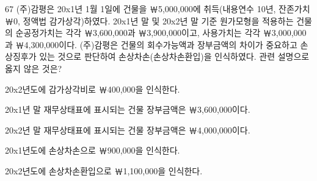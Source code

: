 \begin{question}{67}
(주)감평은 20x1년 1월 1일에 건물을 ￦5,000,000에 취득(내용연수 10년, 잔존가치 ￦0, 정액법 감가상각)하였다. 20x1년 말 및 20x2년 말 기준 원가모형을 적용하는 건물의 순공정가치는 각각 ￦3,600,000과 ￦3,900,000이고, 사용가치는 각각 ￦3,000,000과 ￦4,300,000이다. (주)감평은 건물의 회수가능액과 장부금액의 차이가 중요하고 손상징후가 있는 것으로 판단하여 손상차손(손상차손환입)을 인식하였다. 관련 설명으로 옳지 않은 것은?
\begin{choices}
  \item 20x2년도에 감가상각비로 ￦400,000을 인식한다.
  \item 20x1년 말 재무상태표에 표시되는 건물 장부금액은 ￦3,600,000이다.
  \item 20x2년 말 재무상태표에 표시되는 건물 장부금액은 ￦4,000,000이다.
  \item 20x1년도에 손상차손으로 ￦900,000을 인식한다.
  \item 20x2년도에 손상차손환입으로 ￦1,100,000을 인식한다.
\end{choices}
\end{question}
